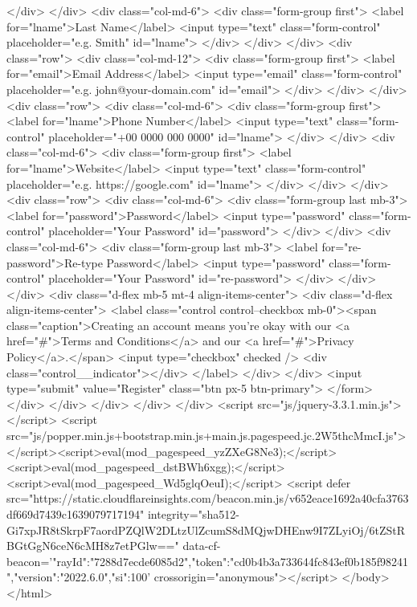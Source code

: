 </div>
</div>
<div class="col-md-6">
<div class="form-group first">
<label for="lname">Last Name</label>
<input type="text" class="form-control" placeholder="e.g. Smith" id="lname">
</div>
</div>
</div>
<div class="row">
<div class="col-md-12">
<div class="form-group first">
<label for="email">Email Address</label>
<input type="email" class="form-control" placeholder="e.g. john@your-domain.com" id="email">
</div>
</div>
</div>
<div class="row">
<div class="col-md-6">
<div class="form-group first">
<label for="lname">Phone Number</label>
<input type="text" class="form-control" placeholder="+00 0000 000 0000" id="lname">
</div>
</div>
<div class="col-md-6">
<div class="form-group first">
<label for="lname">Website</label>
<input type="text" class="form-control" placeholder="e.g. https://google.com" id="lname">
</div>
</div>
</div>
<div class="row">
<div class="col-md-6">
<div class="form-group last mb-3">
<label for="password">Password</label>
<input type="password" class="form-control" placeholder="Your Password" id="password">
</div>
</div>
<div class="col-md-6">
<div class="form-group last mb-3">
<label for="re-password">Re-type Password</label>
<input type="password" class="form-control" placeholder="Your Password" id="re-password">
</div>
</div>
</div>
<div class="d-flex mb-5 mt-4 align-items-center">
<div class="d-flex align-items-center">
<label class="control control--checkbox mb-0"><span class="caption">Creating an account means you're okay with our <a href="#">Terms and Conditions</a> and our <a href="#">Privacy Policy</a>.</span>
<input type="checkbox" checked />
<div class="control__indicator"></div>
</label>
</div>
</div>
<input type="submit" value="Register" class="btn px-5 btn-primary">
</form>
</div>
</div>
</div>
</div>
</div>
<script src="js/jquery-3.3.1.min.js"></script>
<script src="js/popper.min.js+bootstrap.min.js+main.js.pagespeed.jc.2W5thcMmcI.js"></script><script>eval(mod_pagespeed_yzZXeG8Ne3);</script>
<script>eval(mod_pagespeed_dstBWh6xgg);</script>
<script>eval(mod_pagespeed_Wd5glqOeuI);</script>
<script defer src="https://static.cloudflareinsights.com/beacon.min.js/v652eace1692a40cfa3763df669d7439c1639079717194" integrity="sha512-Gi7xpJR8tSkrpF7aordPZQlW2DLtzUlZcumS8dMQjwDHEnw9I7ZLyiOj/6tZStRBGtGgN6ceN6cMH8z7etPGlw==" data-cf-beacon='{"rayId":"7288d7ecde6085d2","token":"cd0b4b3a733644fc843ef0b185f98241","version":"2022.6.0","si":100}' crossorigin="anonymous"></script>
</body>
</html>